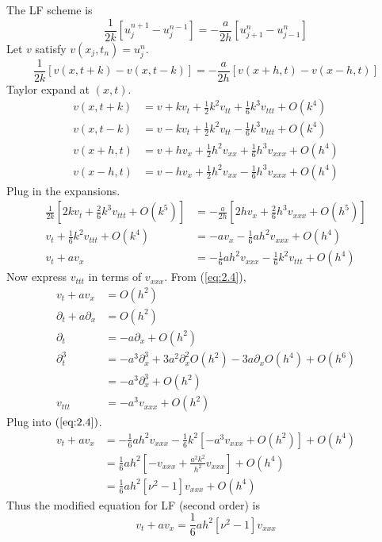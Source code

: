 \documentclass{article}
\newcommand{\sbr}[1]{\left[#1\right]}
\newcommand{\ptl}{\partial}
\begin{document}
\begin{enumerate}[label=(\alph*)]
The LF scheme is
$$\frac{1}{2k}[u_j^{n+1} - u_j^{n-1}] = -\frac{a}{2h}[u_{j+1}^n - u_{j-1}^n]$$
Let $v$ satisfy $v(x_j,t_n)=u_j^n$.
$$\frac{1}{2k}[v(x,t+k) - v(x,t-k)] = -\frac{a}{2h}[v(x+h,t) - v(x-h,t)]$$
Taylor expand at $(x,t)$.
\begin{align*}
	v(x,t+k) &= v + kv_t + \frac12k^2v_{tt} + \frac16k^3v_{ttt} + O(k^4)\\
	v(x,t-k) &= v - kv_t + \frac12k^2v_{tt} - \frac16k^3v_{ttt} + O(k^4)\\
	v(x+h,t) &= v + hv_x + \frac12h^2v_{xx} + \frac16h^3v_{xxx} + O(h^4)\\
	v(x-h,t) &= v - hv_x + \frac12h^2v_{xx} - \frac16h^3v_{xxx} + O(h^4)
\end{align*}
Plug in the expansions.
\begin{align}
	\frac{1}{2k}\sbr{2kv_t + \frac26k^3v_{ttt} + O(k^5)} &= -\frac{a}{2h}\sbr{2hv_x + \frac26h^3v_{xxx} + O(h^5)} \nonumber\\
	v_t + \frac16k^2v_{ttt} + O(k^4) &= -av_x - \frac16ah^2v_{xxx} + O(h^4) \nonumber\\
	v_t + av_x &= -\frac16ah^2v_{xxx} - \frac16k^2v_{ttt} + O(h^4) \label{eq:2.4}
\end{align}
Now express $v_{ttt}$ in terms of $v_{xxx}$. From (\ref{eq:2.4}),
\begin{align*}
	v_t + av_x &= O(h^2)\\
	\ptl_t+ a\ptl_x &= O(h^2)\\
	\ptl_t &= -a\ptl_x + O(h^2)\\
	\ptl_t^3 &= -a^3\ptl_x^3 + 3a^2\ptl_x^2O(h^2) - 3a\ptl_xO(h^4) + O(h^6)\\
	&= -a^3\ptl_x^3 + O(h^2)\\
	v_{ttt} &= -a^3v_{xxx} + O(h^2)
\end{align*}
Plug into $(\ref{eq:2.4})$.
\begin{align*}
	v_t + av_x &= -\frac16ah^2v_{xxx} - \frac16k^2[-a^3v_{xxx} + O(h^2)] + O(h^4)\\
	&= \frac16ah^2\sbr{-v_{xxx} + \frac{a^2k^2}{h^2}v_{xxx}} + O(h^4)\\
	&= \frac16ah^2[\nu^2-1]v_{xxx} + O(h^4)
\end{align*}
Thus the modified equation for LF (second order) is
$$\boxed{v_t + av_x = \frac16ah^2[\nu^2-1]v_{xxx}}$$



\end{enumerate}
\end{document}
